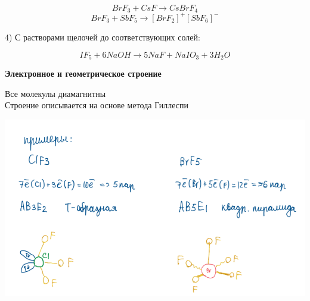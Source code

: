 $$BrF_3 + CsF \rightarrow CsBrF_4$$
$$BrF_3 + SbF_5 \rightarrow [BrF_2]^+[SbF_6]^-$$

4) С растворами щелочей до соответствующих солей: 

$$IF_5 + 6NaOH \rightarrow 5NaF + NaIO_3 + 3H_2O$$

\textbf{Электронное и геометрическое строение}

Все молекулы диамагнитны\\
Строение описывается на основе метода Гиллеспи

\includegraphics{images/4v2.png}